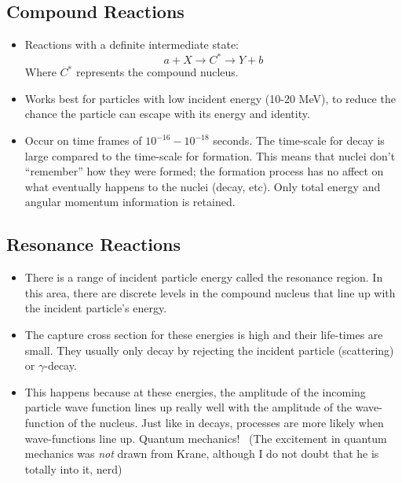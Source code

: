 \documentclass[letter]{article}
\begin{document}
\subsection{Compound Reactions}
\begin{itemize}
\item Reactions with a definite intermediate state:
  \begin{equation*}
    a + X \to C^* \to Y + b
  \end{equation*}
Where $C^*$ represents the compound nucleus.~\cite[pp. 416]{krane}
\item Works best for particles with low incident energy (10-20 MeV),
  to reduce the chance the particle can escape with its energy and
  identity.~\cite[pp. 416]{krane}
\item Occur on time frames of $10^{-16}-10^{-18}$ seconds. The
  time-scale for decay is large compared to the time-scale for
  formation. This means that nuclei don't ``remember'' how they were
  formed; the formation process has no affect on what eventually
  happens to the nuclei (decay, etc). Only total energy and angular
  momentum information is retained.~\cite[Lec 26]{lecture}
\end{itemize}

\subsection{Resonance Reactions}
\begin{itemize}
\item There is a range of incident particle energy called the
  resonance region. In this area, there are discrete levels in the
  compound nucleus that line up with the incident particle's
  energy.~\cite[pp. 424]{krane}
\item The capture cross section for these energies is high and their
  life-times are small. They usually only decay by rejecting the
  incident particle (scattering) or
  $\gamma$-decay.~\cite[pp. 424]{krane}
\item This happens because at these energies, the amplitude of the
  incoming particle wave function lines up really well with the
  amplitude of the wave-function of the
  nucleus. Just like in decays, processes are more likely when
  wave-functions line up. Quantum mechanics!~\cite[pp. 424]{krane}
  (The excitement in quantum mechanics was \textit{not} drawn from
  Krane, although I do not doubt that he is totally into it, nerd)
\end{itemize}
\end{document}
